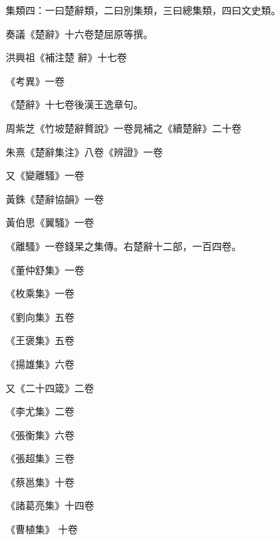
\begin{pinyinscope}

 集類四：一曰楚辭類，二曰別集類，三曰總集類，四曰文史類。



 奏議《楚辭》十六卷楚屈原等撰。



 洪興祖《補注楚
 辭》十七卷



 《考異》一卷



 《楚辭》十七卷後漢王逸章句。



 周紫芝《竹坡楚辭贅說》一卷晁補之《續楚辭》二十卷



 朱熹《楚辭集注》八卷《辨證》一卷



 又《變離騷》一卷



 黃銖《楚辭協韻》一卷



 黃伯思《翼騷》一卷



 《離騷》一卷錢杲之集傳。右楚辭十二部，一百四卷。



 《董仲舒集》一卷



 《枚乘集》一卷



 《劉向集》五卷



 《王褒集》五卷



 《揚雄集》六卷



 又《二十四箴》二卷



 《李尤集》二卷



 《張衡集》六卷



 《張超集》三卷



 《蔡邕集》十卷



 《諸葛亮集》十四卷



 《曹植集》
 十卷




\end{pinyinscope}
